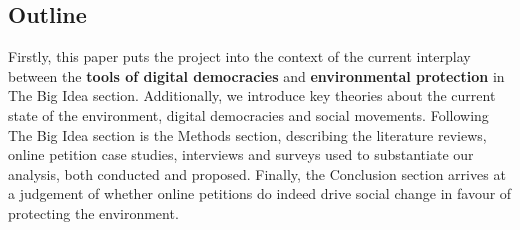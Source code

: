 \subsection{Outline}
\label{subsec:outline}
Firstly, this paper puts the project into the context of the current interplay between the \textbf{tools of digital democracies} and \textbf{environmental protection} in The Big Idea section. Additionally, we introduce key theories about the current state of the environment, digital democracies and social movements. Following The Big Idea section is the Methods section, describing the literature reviews, online petition case studies, interviews and surveys used to substantiate our analysis, both conducted and proposed. Finally, the Conclusion section arrives at a judgement of whether online petitions do indeed drive social change in favour of protecting the environment.


